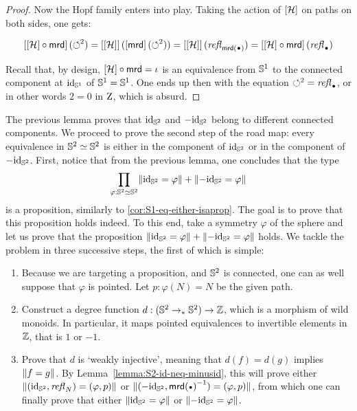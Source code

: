 \documentclass[english,a4]{article}
\renewcommand{\ap}[1]{\left[{#1}\right]}
\newcommand{\ptdto}{\to_\ast}%
\begin{document}
\begin{proof}
  Now the Hopf family enters into play. Taking the action of $\ap\hopf$ on
  paths on both sides, one gets:
  
  \begin{displaymath}
    \ap{\ap\hopf\circ \mrd}(\Sloop^2) = \ap{\ap\hopf}(\ap\mrd(\Sloop^2)) =
    \ap{\ap\hopf}(\refl{\mrd(\base)}) = \ap{\ap\hopf\circ \mrd}(\refl{\base})
  \end{displaymath}
  
  Recall that, by design, ${\ap\hopf}\circ{\mrd} = \iota$ is an equivalence
  from ${{\mathbb S^{1}}}$ to the connected component at $\mathord{\mathrm{id}}_{{\mathbb S^{1}}}$ of ${{\mathbb S^{1}}}={{\mathbb S^{1}}}$. One ends up
  then with the equation $\Sloop^2 = \refl \base$, or in other words $2=0$ in
  $\mathrm{Z}$, which is absurd.
  
\end{proof}

The previous lemma proves that $\mathord{\mathrm{id}}_{{\mathbb S^{2}}}$ and $-\mathord{\mathrm{id}}_{{\mathbb S^{2}}}$ belong 
to different connected components. We proceed to prove the second step
of the road map: every equivalence in ${{\mathbb S^{2}}} \simeq {{\mathbb S^{2}}}$ is
either in the component of $\mathord{\mathrm{id}}_{{\mathbb S^{2}}}$ or in the component of $-\mathord{\mathrm{id}}_{{\mathbb S^{2}}}$. 
First, notice that from the previous lemma, one concludes that the type 
\begin{displaymath}
  \prod_{\varphi:{{\mathbb S^{2}}}\simeq{{\mathbb S^{2}}}}\lVert\mathord{\mathrm{id}}_{{\mathbb S^{2}}} = \varphi\rVert + \lVert-\mathord{\mathrm{id}}_{{\mathbb S^{2}}} = \varphi\rVert
\end{displaymath}
is a proposition, similarly to \cref{cor:S1-eq-either-isaprop}. 
The goal is to prove that this proposition
holds indeed. To this end, take a symmetry $\varphi$ of the sphere and let us
prove that the proposition $\lVert\mathord{\mathrm{id}}_{{\mathbb S^{2}}} = \varphi\rVert + \lVert-\mathord{\mathrm{id}}_{{\mathbb S^{2}}} =
\varphi\rVert$ holds. We tackle the problem in three successive steps,
the first of which is simple: 
\begin{enumerate}
  \item Because we are targeting a proposition, and ${{\mathbb S^{2}}}$ is
    connected, one can as well suppose that $\varphi$ is pointed. 
    Let $p:\varphi(N)=N$ be the given path.
  \item Construct a degree function $d: (\Sp \ptdto \Sp) \to \ZZ$, which is a
    morphism of wild monoids. In particular, it maps pointed equivalences to
    invertible elements in $\mathbb{Z}$, that is $1$ or $-1$.
  \item Prove that $d$ is `weakly injective', meaning that $d(f)=d(g)$ 
    implies $\lVert f=g\rVert$. By Lemma~\ref{lemma:S2-id-neq-minusid},
    this will prove either $\lVert(\mathord{\mathrm{id}}_{{\mathbb S^{2}}},\mathop{{\mathit{refl}}_{N}})=(\varphi,p)\rVert$ 
    or $\Trunc{(-\id_\Sp,\inv{\mrd(\base)})=(\varphi,p)}$, from which
    one can finally prove that either $\lVert\mathord{\mathrm{id}}_{{\mathbb S^{2}}} = \varphi\rVert$ or
    $\lVert-\mathord{\mathrm{id}}_{{\mathbb S^{2}}} = \varphi\rVert$.\label{it:weakly_injective}
\end{enumerate}
\end{document}
